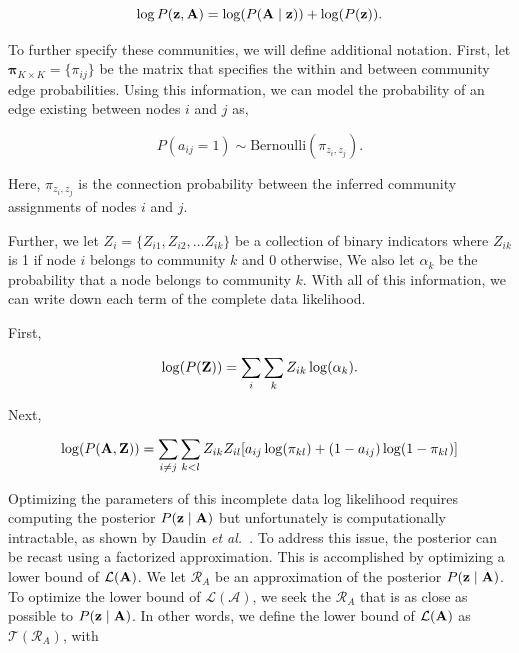 \begin{equation}
\log P({\bf z},{\bf A})=\log(P({\bf A} \mid {\bf z}))+\log(P({\bf z})).
\end{equation}

To further specify these communities, we will define additional notation. First, let ${\boldsymbol \pi}_{K \times K}=\{\pi_{ij}\}$ be the matrix that specifies the within and between community edge probabilities. Using this information, we can model the probability of an edge existing between nodes $i$ and $j$ as,

\begin{equation}
P(a_{ij}=1)\sim \text{Bernoulli}(\pi_{z_{i},z_{j}}).
\end{equation}

Here, $\pi_{z_{i},z_{j}}$ is the connection probability between the inferred community assignments of nodes $i$ and $j$. 

Further, we let $Z_{i}=\{Z_{i1},Z_{i2}, \dots Z_{ik}\}$ be a collection of binary indicators where $Z_{ik}$ is 1 if node $i$ belongs to community $k$ and 0 otherwise, We also let $\alpha_{k}$ be the probability that a node belongs to community $k$. With all of this information, we can write down each term of the complete data likelihood.

First,

\begin{equation}
\log(P({\bf Z}))=\sum_{i}\sum_{k}Z_{ik}\log(\alpha_{k}).
\end{equation}

Next,

\begin{equation}
\log(P({\bf A},{\bf Z}))=\sum_{i\ne j}\sum_{k< l}Z_{ik}Z_{il}[a_{ij}\log (\pi_{kl})+(1-a_{ij})\log(1-\pi_{kl})]
\end{equation}

Optimizing the parameters of this incomplete data log likelihood requires computing the posterior $P({\bf z} \mid {\bf A})$ but unfortunately is computationally intractable, as shown by Daudin \emph{et al.}~\cite{dudin}. To address this issue, the posterior can be recast using a factorized approximation. This is accomplished by optimizing a lower bound of $\mathcal{L}({\bf A})$. We let $\mathcal{R}_{A}$ be an approximation of the posterior $P({\bf z} \mid {\bf A})$. To optimize the lower bound of $\mathcal{L}(\mathcal{A})$, we seek the $\mathcal{R}_{A}$ that is as close as possible to $P({\bf z} \mid {\bf A})$. In other words, we define the lower bound of $\mathcal{L}({\bf A})$ as $\mathcal{T}(\mathcal{R}_{A})$, with

